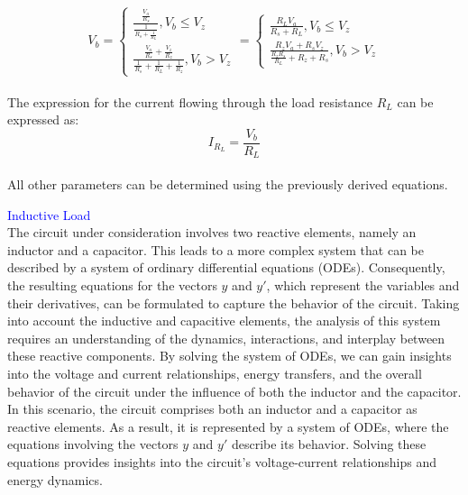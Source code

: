 \begin{equation}
    V_b=\begin{cases}
        \frac{\frac{V_a}{R_s}}{\frac{1}{R_s+\frac{1}{R_L}}}, V_b \leq V_z\\
        \frac{\frac{V_a}{R_s}+\frac{V_z}{R_z}}{\frac{1}{R_s}+\frac{1}{R_L}+\frac{1}{R_z}}, V_b>V_z
    \end{cases}=\begin{cases}
        \frac{R_LV_a}{R_s+R_L}, V_b \leq V_z\\
        \frac{R_zV_a+R_sV_z}{\frac{R_zR_s}{R_L}+R_z+R_s}, V_b>V_z
    \end{cases}
\end{equation}\\

The expression for the current flowing through the load resistance $R_L$ can be expressed as:\\

\begin{equation}
    I_{R_L}=\frac{V_b}{R_L}
\end{equation}\\

All other parameters can be determined using the previously derived equations.

\Large\textcolor{blue}{Inductive Load}\\

 The circuit under consideration involves two reactive elements, namely an inductor and a capacitor. This leads to a more complex system that can be described by a system of ordinary differential equations (ODEs). Consequently, the resulting equations for the vectors $y$ and $y'$, which represent the variables and their derivatives, can be formulated to capture the behavior of the circuit. Taking into account the inductive and capacitive elements, the analysis of this system requires an understanding of the dynamics, interactions, and interplay between these reactive components. By solving the system of ODEs, we can gain insights into the voltage and current relationships, energy transfers, and the overall behavior of the circuit under the influence of both the inductor and the capacitor.\\

In this scenario, the circuit comprises both an inductor and a capacitor as reactive elements. As a result, it is represented by a system of ODEs, where the equations involving the vectors $y$ and $y'$ describe its behavior. Solving these equations provides insights into the circuit's voltage-current relationships and energy dynamics.\\

